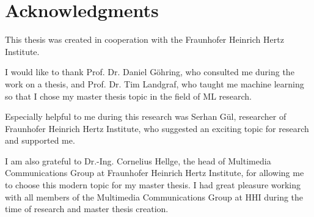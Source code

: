 \chapter*{Acknowledgments}
This thesis was created in cooperation with the Fraunhofer Heinrich Hertz Institute.

I would like to thank Prof. Dr. Daniel Göhring, who consulted me during the work on a thesis, and Prof. Dr. Tim Landgraf, who taught me machine learning so that I chose my master thesis topic in the field of ML research. 

Especially helpful to me during this research was Serhan Gül, researcher of Fraunhofer Heinrich Hertz Institute, who suggested an exciting topic for research and supported me. 

I am also grateful to Dr.-Ing. Cornelius Hellge, the head of Multimedia Communications Group at Fraunhofer Heinrich Hertz Institute, for allowing me to choose this modern topic for my master thesis. I had great pleasure working with all members of the Multimedia Communications Group  at HHI during the time of research and master thesis creation. 

